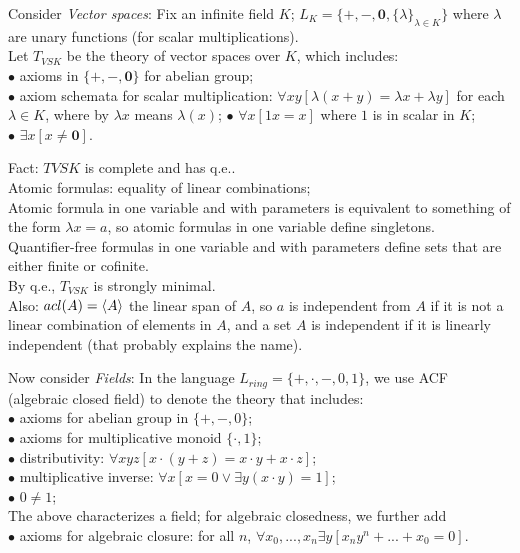 \documentclass[a4paper]{article}
\begin{document}
\begin{eg}
    Consider \emph{Vector spaces}: Fix an infinite field $K$; $L_K = \{+,-,\mathbf{0},\{\lambda\}_{\lambda \in K}\}$ where $\lambda$ are unary functions (for scalar multiplications).\\
    Let $T_{VSK}$ be the theory of vector spaces over $K$, which includes:\\
    $\bullet$ axioms in $\{+,-,\mathbf{0}\}$ for abelian group;\\
    $\bullet$ axiom schemata for scalar multiplication: $\forall xy[\lambda(x+y)=\lambda x+\lambda y]$ for each $\lambda \in K$, where by $\lambda x$ means $\lambda(x)$;
    $\bullet$ $\forall x [1x = x]$ where $1$ is in scalar in $K$;\\
    $\bullet$ $\exists x[x \neq \mathbf{0}]$.

    Fact: $T{VSK}$ is complete and has q.e..\\
    Atomic formulas: equality of linear combinations;\\
    Atomic formula in one variable and with parameters is equivalent to something of the form $\lambda x = a$, so atomic formulas in one variable define singletons.\\
    Quantifier-free formulas in one variable and with parameters define sets that are either finite or cofinite.\\
    By q.e., $T_{VSK}$ is strongly minimal.\\
    Also: $acl(A) = \langle A \rangle$ the linear span of $A$, so $a$ is independent from $A$ if it is not a linear combination of elements in $A$, and a set $A$ is independent if it is linearly independent (that probably explains the name).

    Now consider \emph{Fields}: In the language $L_{ring} =\{+,\cdot,-,0,1\}$, we use ACF (algebraic closed field) to denote the theory that includes:\\
    $\bullet$ axioms for abelian group in $\{+,-,0\}$;\\
    $\bullet$ axioms for multiplicative monoid $\{\cdot,1\}$;\\
    $\bullet$ distributivity: $\forall xyz [x \cdot (y+z) = x \cdot y + x \cdot z]$;\\
    $\bullet$ multiplicative inverse: $\forall x [x = 0 \vee \exists y ( x \cdot y) = 1]$;\\
    $\bullet$ $0 \neq 1$;\\
    The above characterizes a field; for algebraic closedness, we further add\\
    $\bullet$ axioms for algebraic closure: for all $n$, $\forall x_0,...,x_n \exists y [x_n y^n + ... + x_0 = 0]$.


\end{eg}
\end{document}
